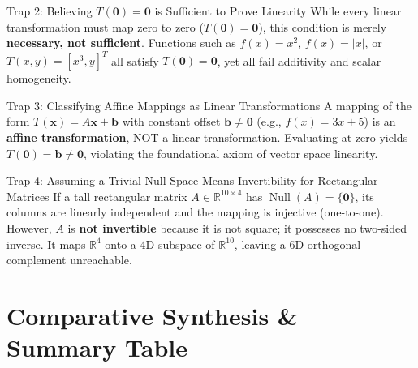\begin{trapbox}{Trap 2: Believing $T(\mathbf{0}) = \mathbf{0}$ is Sufficient to Prove Linearity}
While every linear transformation must map zero to zero ($T(\mathbf{0}) = \mathbf{0}$), this condition is merely \textbf{necessary, not sufficient}. Functions such as $f(x) = x^2$, $f(x) = |x|$, or $T(x, y) = [x^3, y]^T$ all satisfy $T(\mathbf{0}) = \mathbf{0}$, yet all fail additivity and scalar homogeneity.
\end{trapbox}

\begin{trapbox}{Trap 3: Classifying Affine Mappings as Linear Transformations}
A mapping of the form $T(\mathbf{x}) = A\mathbf{x} + \mathbf{b}$ with constant offset $\mathbf{b} \neq \mathbf{0}$ (e.g., $f(x) = 3x + 5$) is an \textbf{affine transformation}, NOT a linear transformation. Evaluating at zero yields $T(\mathbf{0}) = \mathbf{b} \neq \mathbf{0}$, violating the foundational axiom of vector space linearity.
\end{trapbox}

\begin{trapbox}{Trap 4: Assuming a Trivial Null Space Means Invertibility for Rectangular Matrices}
If a tall rectangular matrix $A \in \mathbb{R}^{10 \times 4}$ has $\operatorname{Null}(A) = \{\mathbf{0}\}$, its columns are linearly independent and the mapping is injective (one-to-one). However, $A$ is \textbf{not invertible} because it is not square; it possesses no two-sided inverse. It maps $\mathbb{R}^4$ onto a 4D subspace of $\mathbb{R}^{10}$, leaving a 6D orthogonal complement unreachable.
\end{trapbox}

\section{Comparative Synthesis \& Summary Table}

